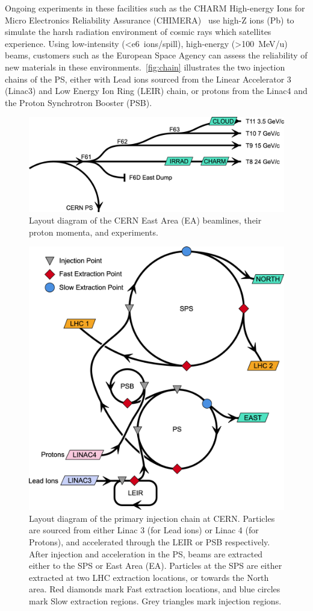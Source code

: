 \documentclass[11pt]{report}
\begin{document}
Ongoing experiments in these facilities such as the CHARM High-energy Ions for Micro Electronics Reliability Assurance (CHIMERA)~\cite{Fraser:feasibility} use high-Z ions (Pb) to simulate the harsh radiation environment of cosmic rays which satellites experience. Using low-intensity (\qty{<e6}{ions/spill}), high-energy (\qty{>100}{\MeV / u}) beams, customers such as the European Space Agency can assess the reliability of new materials in these environments.~\autoref{fig:chain} illustrates the two injection chains of the PS, either with Lead ions sourced from the Linear Accelerator 3 (Linac3) and Low Energy Ion Ring (LEIR) chain, or protons from the Linac4 and the Proton Synchrotron Booster (PSB).

\begin{figure}
  \centering
  \includegraphics[width=\linewidth]{east-area.png}
  \caption{Layout diagram of the CERN East Area (EA) beamlines, their proton momenta, and experiments.}\label{fig:eadiagram}
\end{figure}

\begin{figure}
  \centering
  \includegraphics*[width=0.8\linewidth]{complex.png}
  \caption{Layout diagram of the primary injection chain at CERN. Particles are sourced from either Linac 3 (for Lead ions) or Linac 4 (for Protons), and accelerated through the LEIR or PSB respectively. After injection and acceleration in the PS, beams are extracted either to the SPS or East Area (EA). Particles at the SPS are either extracted at two LHC extraction locations, or towards the North area. Red diamonds mark Fast extraction locations, and blue circles mark Slow extraction regions. Grey triangles mark injection regions.}\label{fig:chain}
\end{figure}
\end{document}
